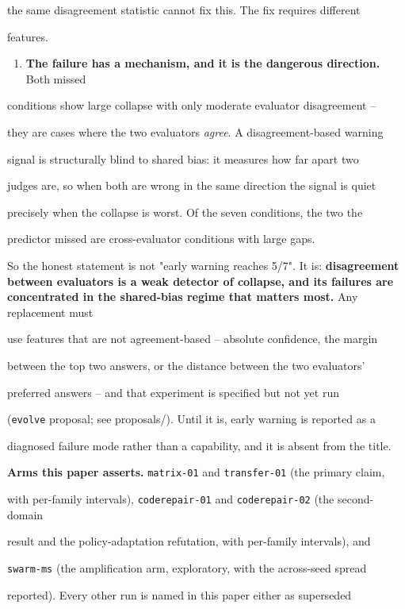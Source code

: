 \documentclass[11pt]{article}
\begin{document}
the same disagreement statistic cannot fix this. The fix requires different

features.

\begin{enumerate}\item {\bf The failure has a mechanism, and it is the dangerous direction.} Both missed
\end{enumerate}
conditions show large collapse with only moderate evaluator disagreement --

they are cases where the two evaluators {\it agree}. A disagreement-based warning

signal is structurally blind to shared bias: it measures how far apart two

judges are, so when both are wrong in the same direction the signal is quiet

precisely when the collapse is worst. Of the seven conditions, the two the

predictor missed are cross-evaluator conditions with large gaps.


So the honest statement is not "early warning reaches 5/7". It is: {\bf disagreement between evaluators is a weak detector of collapse, and its failures are concentrated in the shared-bias regime that matters most.} Any replacement must

use features that are not agreement-based -- absolute confidence, the margin

between the top two answers, or the distance between the two evaluators'

preferred answers -- and that experiment is specified but not yet run

(\texttt{evolve} proposal; see proposals/). Until it is, early warning is reported as a

diagnosed failure mode rather than a capability, and it is absent from the title.


{\bf Arms this paper asserts.} \texttt{matrix-01} and \texttt{transfer-01} (the primary claim,

with per-family intervals), \texttt{coderepair-01} and \texttt{coderepair-02} (the second-domain

result and the policy-adaptation refutation, with per-family intervals), and

\texttt{swarm-ms} (the amplification arm, exploratory, with the across-seed spread

reported). Every other run is named in this paper either as superseded
\end{document}
